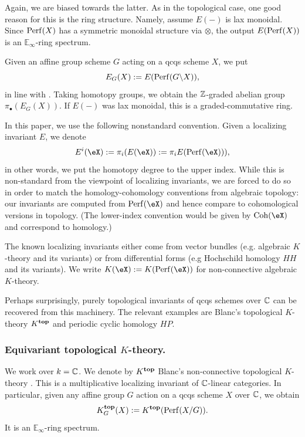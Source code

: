 Again, we are biased towards the latter.
As in the topological case, one good reason for this is the ring structure. Namely, assume $E(-)$ is lax monoidal. Since $\operatorname{Perf}(X)$ has a symmetric monoidal structure via $\otimes$, the output $E(\operatorname{Perf}(X))$ is an $\mathbb{E}_{\infty}$-ring spectrum.

Given an affine group scheme $G$ acting on a qcqs scheme $X$, we put
\begin{equation*}
    E_G(X) := E(\operatorname{Perf}(G \backslash X)),
\end{equation*}
in line with \cite{Tho88, TT90}.
Taking homotopy groups, we obtain the $\operatorname{\mathbb{Z}}$-graded abelian group $\pi_{\bullet}(E_G(X))$. If $E(-)$ was lax monoidal, this is a graded-commutative ring.

\begin{convention}\label{remark: regrettable indices}
In this paper, we use the following nonstandard convention. Given a localizing invariant $E$, we denote 
\begin{equation*}
E^{i}(\eX) := \pi_{i}(E(\eX)) := \pi_{i}E(\Perf(\eX))),   
\end{equation*}
in other words, we put the homotopy degree to the upper index. While this is non-standard from the viewpoint of localizing invariants, we are forced to do so in order to match the homology-cohomology conventions from algebraic topology: our invariants are computed from $\Perf(\eX)$ and hence compare to cohomological versions in topology. (The lower-index convention would be given by $\Coh(\eX)$ and correspond to homology.)
\end{convention}



The known localizing invariants either come from vector bundles (e.g. algebraic $K$-theory and its variants) or from differential forms (e.g Hochschild homology $HH$ and its variants). 
%
We write $K(\eX) := K(\Perf(\eX))$ for non-connective algebraic $K$-theory.

Perhaps surprisingly, purely topological invariants of qcqs schemes over $\operatorname{\mathbb{C}}$ can be recovered from this machinery. The relevant examples are Blanc's topological $K$-theory $K^{\mathbf{top}}$ and periodic cyclic homology $HP$.




\subsubsection{Equivariant topological $K$-theory.}
We work over $k=\operatorname{\mathbb{C}}$. We denote by $K^{\mathbf{top}}$ Blanc's non-connective topological $K$-theory \cite{Bla16}. This is a multiplicative localizing invariant of $\operatorname{\mathbb{C}}$-linear categories.
In particular, given any affine group $G$ action on a qcqs scheme $X$ over $\operatorname{\mathbb{C}}$, we obtain
\begin{equation*}
    K^{\mathbf{top}}_G(X) := K^{\mathbf{top}}(\operatorname{Perf}(X/G)).
\end{equation*}
It is an $\mathbb{E}_{\infty}$-ring spectrum.

